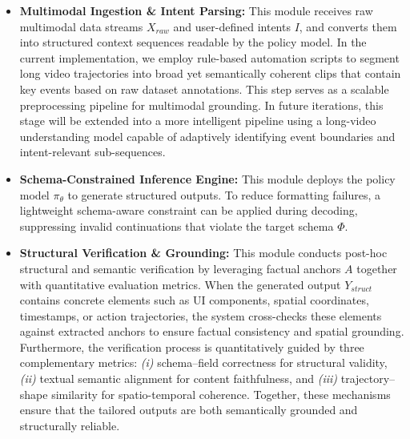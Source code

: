     

\begin{itemize}[leftmargin=20pt, labelsep=4pt]
    \item \textbf{Multimodal Ingestion \& Intent Parsing:} This module receives raw multimodal data streams \(X_{raw}\) and user-defined intents \(I\), and converts them into structured context sequences readable by the policy model. 
    In the current implementation, we employ rule-based automation scripts to segment long video trajectories into broad yet semantically coherent clips that contain key events based on raw dataset annotations. 
    This step serves as a scalable preprocessing pipeline for multimodal grounding. 
    In future iterations, this stage will be extended into a more intelligent pipeline using a long-video understanding model capable of adaptively identifying event boundaries and intent-relevant sub-sequences.
    
    \item \textbf{Schema-Constrained Inference Engine:} This module deploys the policy model \(\pi_\theta\) to generate structured outputs. To reduce formatting failures, a lightweight schema-aware constraint can be applied during decoding, suppressing invalid continuations that violate the target schema \(\Phi\).
    
    \item \textbf{Structural Verification \& Grounding:} 
This module conducts post-hoc structural and semantic verification by leveraging factual anchors \(A\) together with quantitative evaluation metrics. 
When the generated output \(Y_{struct}\) contains concrete elements such as UI components, spatial coordinates, timestamps, or action trajectories, the system cross-checks these elements against extracted anchors to ensure factual consistency and spatial grounding. 
Furthermore, the verification process is quantitatively guided by three complementary metrics: 
\textit{(i)} schema–field correctness for structural validity, 
\textit{(ii)} textual semantic alignment for content faithfulness, and 
\textit{(iii)} trajectory–shape similarity for spatio-temporal coherence. 
Together, these mechanisms ensure that the tailored outputs are both semantically grounded and structurally reliable.
\end{itemize}



